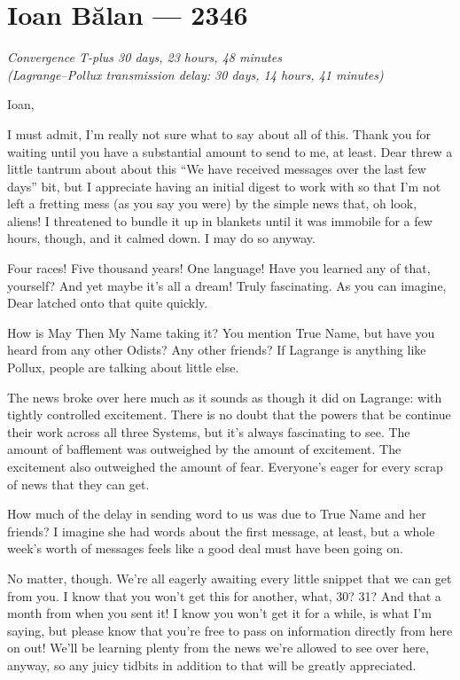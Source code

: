 \hypertarget{ioan-bux103lan-2346}{%
\chapter{Ioan Bălan — 2346}\label{ioan-bux103lan-2346}}

\begin{center}
\emph{Convergence T-plus 30 days, 23 hours, 48 minutes}\\
\emph{(Lagrange--Pollux transmission delay: 30 days, 14 hours, 41 minutes)}
\end{center}

\noindent Ioan,

I must admit, I'm really not sure what to say about all of this. Thank you for waiting until you have a substantial amount to send to me, at least. Dear threw a little tantrum about about this ``We have received messages over the last few days'' bit, but I appreciate having an initial digest to work with so that I'm not left a fretting mess (as you say you were) by the simple news that, oh look, aliens! I threatened to bundle it up in blankets until it was immobile for a few hours, though, and it calmed down. I may do so anyway.

Four races! Five thousand years! One language! Have you learned any of that, yourself? And yet maybe it's all a dream! Truly fascinating. As you can imagine, Dear latched onto that quite quickly.
 
How is May Then My Name taking it? You mention True Name, but have you heard from any other Odists? Any other friends? If Lagrange is anything like Pollux, people are talking about little else.

The news broke over here much as it sounds as though it did on Lagrange: with tightly controlled excitement. There is no doubt that the powers that be continue their work across all three Systems, but it's always fascinating to see. The amount of bafflement was outweighed by the amount of excitement. The excitement also outweighed the amount of fear. Everyone's eager for every scrap of news that they can get.

How much of the delay in sending word to us was due to True Name and her friends? I imagine she had words about the first message, at least, but a whole week's worth of messages feels like a good deal must have been going on.

No matter, though. We're all eagerly awaiting every little snippet that we can get from you. I know that you won't get this for another, what, 30? 31? And that a month from when you sent it! I know you won't get it for a while, is what I'm saying, but please know that you're free to pass on information directly from here on out! We'll be learning plenty from the news we're allowed to see over here, anyway, so any juicy tidbits in addition to that will be greatly appreciated.

